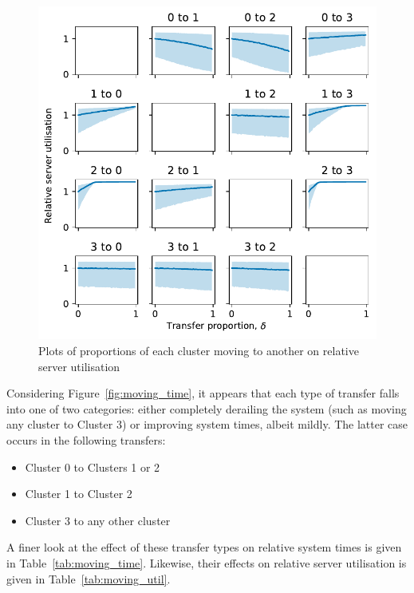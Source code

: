 \begin{figure}
    \centering
    \includegraphics[width=\textwidth]{moving_util}
    \caption{%
        Plots of proportions of each cluster moving to another on relative
        server utilisation
    }\label{fig:moving_util}
\end{figure}

Considering Figure~\ref{fig:moving_time}, it appears that each type of transfer
falls into one of two categories: either completely derailing the system (such
as moving any cluster to Cluster 3) or improving system times, albeit mildly. 
The latter case occurs in the following transfers:

\begin{itemize}
    \item Cluster 0 to Clusters 1 or 2
    \item Cluster 1 to Cluster 2
    \item Cluster 3 to any other cluster
\end{itemize}

A finer look at the effect of these transfer types on relative system times is
given in Table~\ref{tab:moving_time}. Likewise, their effects on relative server
utilisation is given in Table~\ref{tab:moving_util}. 

\begin{table}
    \centering%
    \resizebox{\textwidth}{!}{%
        
    }
    \caption{%
        Proportional changes in median relative system time for selected cluster
        transfers
    }\label{tab:moving_time}
\end{table}

